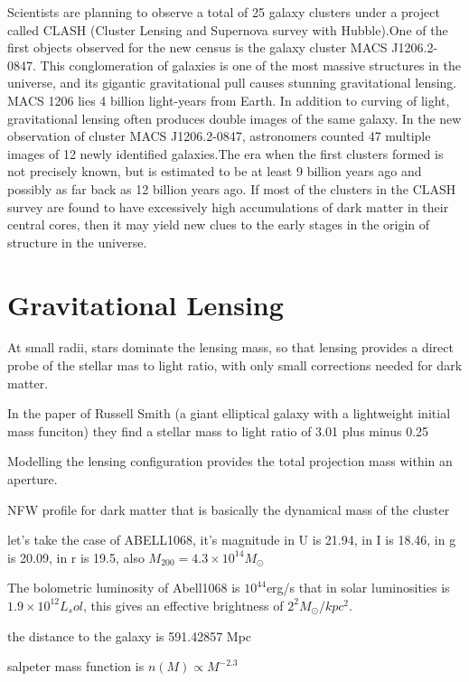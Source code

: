 Scientists are planning to observe a total of 25 galaxy clusters under a project called CLASH (Cluster Lensing and Supernova survey with Hubble).One of the first objects observed for the new census is the galaxy cluster MACS J1206.2-0847. This conglomeration of galaxies is one of the most massive structures in the universe, and its gigantic gravitational pull causes stunning gravitational lensing. MACS 1206 lies 4 billion light-years from Earth. In addition to curving of light, gravitational lensing often produces double images of the same galaxy. In the new observation of cluster MACS J1206.2-0847, astronomers counted 47 multiple images of 12 newly identified galaxies.The era when the first clusters formed is not precisely known, but is estimated to be at least 9 billion years ago and possibly as far back as 12 billion years ago. If most of the clusters in the CLASH survey are found to have excessively high accumulations of dark matter in their central cores, then it may yield new clues to the early stages in the origin of structure in the universe.


\section{Gravitational Lensing}

At small radii, stars dominate the lensing mass, so that lensing provides a direct probe of the stellar mas to light ratio, with only small corrections needed for dark matter.

In the paper of Russell Smith (a giant elliptical galaxy with a lightweight initial mass funciton) they find a stellar mass to light ratio of 3.01 plus minus 0.25

Modelling the lensing configuration provides the total projection mass within an aperture.

NFW profile for dark matter that is basically the dynamical mass of the cluster

let's take the case of ABELL1068, it's magnitude in U is 21.94, in I is 18.46, in g is 20.09, in r is 19.5, also $M_{200}=4.3\times 10^{14}M_{\odot}$

The bolometric luminosity of Abell1068 is $10^44$erg/s that in solar luminosities is $1.9\times 10^{12} L_sol$, this gives an effective brightness of $2^{2}M_{\odot}/kpc^2$.

the distance to the galaxy is 591.42857 Mpc	

salpeter mass function is $n(M)\propto M^{-2.3}$  

